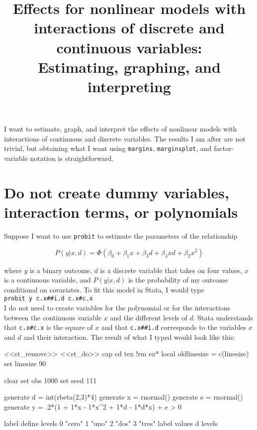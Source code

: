 \documentclass[11pt]{article}
\title{Effects for nonlinear models with interactions of discrete and continuous variables: \\
\Large Estimating, graphing, and interpreting}
\date{}
\begin{document}
\maketitle

I want to estimate, graph, and interpret the effects of nonlinear models with interactions of continuous and discrete variables. The results I am after are not trivial, but obtaining what I want using \texttt{margins}, \texttt{marginsplot}, and factor-variable notation is straightforward. 

\section*{Do not create dummy variables, interaction terms, or polynomials}

Suppose I want to use \texttt{probit} to estimate the parameters of the relationship

\begin{equation*}
P(y|x, d) = \Phi \left(\beta_0 + \beta_1x + \beta_3d + \beta_4xd + \beta_2x^2 \right)  
\end{equation*}  

\noindent where $y$ is a binary outcome, $d$ is a discrete variable that takes on four values, $x$ is a continuous variable, and $P(y|x,d)$ is the probability of my outcome conditional on covariates. To fit this model in Stata, I would type \\

\texttt{probit y  c.x\#\#i.d c.x\#c.x} \\

I do not need to create variables for the polynomial or for the interactions between the continuous variable $x$ and the different levels of $d$. Stata understands that \texttt{c.x\#c.x} is the square of $x$ and that \texttt{c.x\#\#i.d} corresponds to the variables $x$ and $d$ and their interaction. The result of what I typed would look like this:

<<st_remove>>
<<st_do>>
cap cd tex
!rm ex*
local oldlinesize = c(linesize)
set linesize 90

clear 
set obs 1000
set seed 111

generate d = int(rbeta(2,3)*4)
generate x = rnormal()
generate e = rnormal()
generate y = .2*(1 + 1*x - 1*x^2 + 1*d - 1*d*x) + e > 0  

label define levels 0 "cero" 1 "uno" 2 "dos" 3 "tres"
label values d levels
\end{document}
